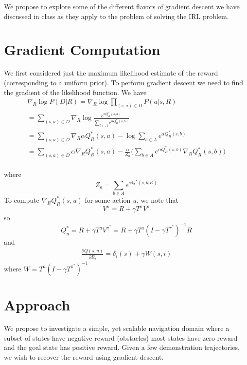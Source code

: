 \documentclass[10pt,a4paper]{article}
\begin{document}
We propose to explore some of the different flavors of gradient descent we have discussed in class as they apply to the problem of solving the IRL problem.

\section{Gradient Computation}
We first considered just the maximum likelihood estimate of the reward (corresponding to a uniform prior). To perform gradient descent we need to find the gradient of the likelihood function. We have 
\begin{eqnarray}
\nabla_R \log P(D | R) = \nabla_R \log \prod_{(s,a) \in D} P(a | s, R) \\
=\sum_{(s,a) \in D} \nabla_R \log \frac{e^{\alpha Q_R^*(s,a)}}{\sum_{b \in A} e^{\alpha Q_R^*(s,b)}}\\
= \sum_{(s,a) \in D} \nabla_R \alpha Q_R^*(s,a) - \log \sum_{b \in A} e^{\alpha Q_R^*(s,b)}\\
= \sum_{(s,a) \in D} \alpha \nabla_R Q_R^*(s,a) - \frac{\alpha}{Z_a}\bigg(\sum_{b \in A} e^{\alpha Q_R^*(s,b)} \nabla_R Q_R^*(s,b)\bigg)\\
\end{eqnarray}

where 
\begin{equation}
Z_a = \sum_{b \in A} e^{\alpha Q^*(s,b|R)}
\end{equation}
To compute $\nabla_R Q^*_R(s,u)$ for some action $u$, we note that 
\begin{equation}
V^{\pi} = R + \gamma T^{\pi} V^{\pi}
\end{equation}
so 
\begin{equation}
Q^*_u = R + \gamma T^a V^{\pi^*} = R + \gamma T^a(I - \gamma T^{\pi^*})^{-1}R
\end{equation}
and
\begin{eqnarray}
\frac{\partial Q(s,u)}{\partial R_i} = \delta_i(s) + \gamma W(s,i)
\end{eqnarray}
where $W = T^a(I - \gamma T^{\pi^*})^{-1}$

\section{Approach}
We propose to investigate a simple, yet scalable navigation domain where a subset of states have negative reward (obstacles) most states have zero reward and the goal state has positive reward. Given a few demonstration trajectories, we wish to recover the reward using gradient descent.
\end{document}
